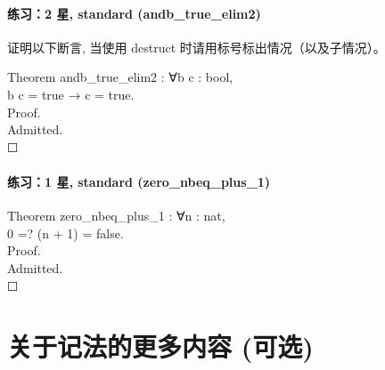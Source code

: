 \documentclass[utf8]{ctexart}
\let\oldparagraph\paragraph
\renewcommand{\paragraph}[1]{\oldparagraph{#1}\mbox{}}
\begin{document}
\protect\hypertarget{lab38}{}{}

\hypertarget{ux7ec3ux4e602-ux661f-standard-andb_true_elim2}{%
\paragraph{练习：2 星, standard
(andb\_true\_elim2)}\label{ux7ec3ux4e602-ux661f-standard-andb_true_elim2}}

证明以下断言, 当使用 {{destruct}} 时请用标号标出情况（以及子情况）。

{Theorem} {andb\_true\_elim2} : {∀}{b} {c} : {bool},\\
\hspace*{0.333em}\hspace*{0.333em}{andb} {b} {c} = {true} → {c} =
{true}.\\
{Proof}.\\
\hspace*{0.333em}\hspace*{0.333em}{(*~请在此处解答~*)} {Admitted}.\\

{☐}

\protect\hypertarget{lab39}{}{}

\hypertarget{ux7ec3ux4e601-ux661f-standard-zero_nbeq_plus_1}{%
\paragraph{练习：1 星, standard
(zero\_nbeq\_plus\_1)}\label{ux7ec3ux4e601-ux661f-standard-zero_nbeq_plus_1}}

{Theorem} {zero\_nbeq\_plus\_1} : {∀}{n} : {nat},\\
\hspace*{0.333em}\hspace*{0.333em}0 =? ({n} + 1) = {false}.\\
{Proof}.\\
\hspace*{0.333em}\hspace*{0.333em}{(*~请在此处解答~*)} {Admitted}.\\

{☐}

\protect\hypertarget{lab40}{}{}

\hypertarget{ux5173ux4e8eux8bb0ux6cd5ux7684ux66f4ux591aux5185ux5bb9-ux53efux9009}{%
\section{关于记法的更多内容
(可选)}\label{ux5173ux4e8eux8bb0ux6cd5ux7684ux66f4ux591aux5185ux5bb9-ux53efux9009}}
\end{document}
